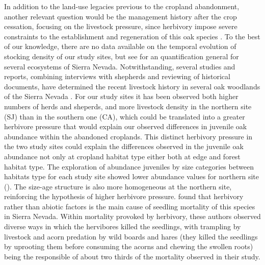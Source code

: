 In addition to the land-use legacies previous to the cropland abandonment, another relevant question would be the management history after the crop cessation, focusing on the livestock pressure, since herbivory impose severe constraints to the establishment and regeneration of this oak species \autocites{Gomez2003ImpactVertebrate, Pereaetal2014InteraccionesPlantaanimal}. To the best of our knowledge, there are no data available on the temporal evolution of stocking density of our study sites, but see \citet{RoblesCruz2008ConjuntoSierras} for an quantification general for several ecosystems of Sierra Nevada. Notwithstanding, several studies and reports, combining interviews with shepherds and reviewing of historical documents, have determined the recent livestock history in several oak woodlands of the Sierra Nevada \autocites{MorenoLlorcaetal2016HistoricalAnalysis, MorenoLlorcaetal2014CaracterizacionFuentes,MorenoLlorcaZamora2012CaracterizacionCarga}. For our study sites it has been observed both higher numbers of herds and sheperds, and more livestock density in the northern site (SJ) than in the southern one (CA), which could be translated into a greater herbivore pressure that would explain our observed differences in juvenile oak abundance within the abandoned croplands. This distinct herbivory pressure in the two study sites could explain the differences observed in the juvenile oak abundance not only at cropland habitat type either both at edge and forest habitat type. The exploration of abundance juveniles by size categories between habitats type for each study site showed lower abundance values for northern site (). The size-age structure is also more homogeneous at the northern site, reinforcing the hypothesis of higher herbivore pressure. \citet{Gomez2003ImpactVertebrate} found that herbivory rather than abiotic factors is the main cause of seedling mortality of this species in Sierra Nevada. Within mortality provoked by herbivory, these authors observed diverse ways in which the hervibores killed the seedlings, with trampling by livestock and acorn predation by wild boards and hares (they killed the seedlings by uprooting them before consuming the acorns and chewing the swollen roots) being the responsible of about two thirds of the mortality observed in their study. 

